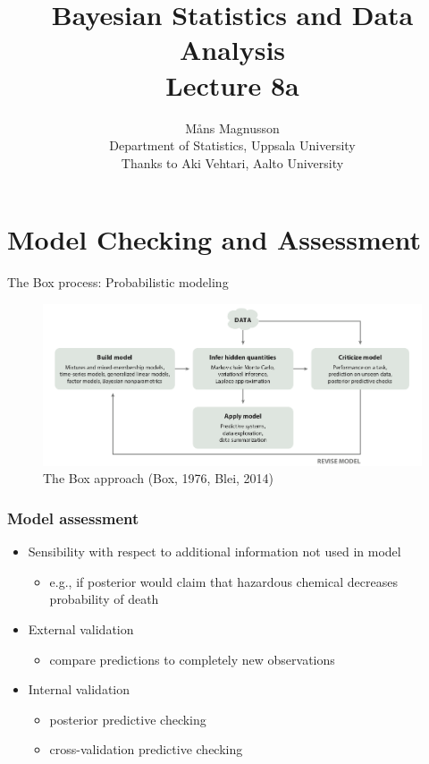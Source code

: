 \documentclass[10pt]{beamer}
\title[]{{\color{black}Bayesian Statistics and Data Analysis \\ Lecture 8a}}
\author[]{M{\aa}ns Magnusson \\ Department of Statistics, Uppsala University \\ Thanks to Aki Vehtari, Aalto University}
\date{}
\begin{document}
\frame{\titlepage
}



\section{Model Checking and Assessment}
\frame{\sectionpage}



\begin{frame}{The Box process: Probabilistic modeling}

\begin{figure}
    \centering
    \includegraphics[width=1\textwidth]{figs/Boxs_loop.png}
    \caption{The Box approach (Box, 1976, Blei, 2014)}
\end{figure}
\end{frame}

\begin{frame}

\frametitle{Model assessment}

  \begin{itemize}
  \item<+-> Sensibility with respect to additional information not used in model
    \begin{itemize}
    \item e.g., if posterior would claim that hazardous chemical
      decreases probability of death
    \end{itemize}
  \item<+-> External validation
    \begin{itemize}
    \item compare predictions to completely new observations
    \end{itemize}
  \item<+-> Internal validation
    \begin{itemize}
    \item posterior predictive checking
    \item cross-validation predictive checking
    \end{itemize}
  \end{itemize}

\end{frame}
\end{document}
